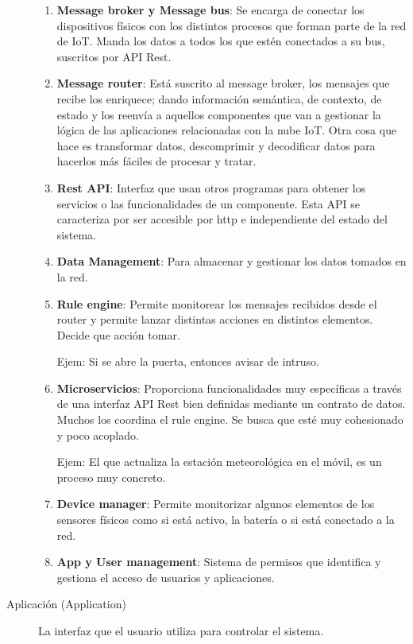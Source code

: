 \documentclass[12pt, twoside, openright]{report} %
\begin{document}
\begin{description}
	      \begin{enumerate}
		      \item \textbf{Message broker y Message bus}: Se encarga de conectar los
		            dispositivos físicos con los distintos procesos que forman parte de la
		            red de IoT. Manda los datos a todos los que estén conectados a su bus,
		            suscritos por API Rest.
		      \item \textbf{Message router}: Está suscrito al message broker, los mensajes
		            que recibe los enriquece; dando información semántica, de contexto, de
		            estado y los reenvía a aquellos componentes que van a gestionar la
		            lógica de las aplicaciones relacionadas con la nube IoT. Otra cosa que
		            hace es transformar datos, descomprimir y decodificar datos para
		            hacerlos más fáciles de procesar y tratar.
		      \item \textbf{Rest API}: Interfaz que usan otros programas para obtener los
		            servicios o las funcionalidades de un componente. Esta API se
		            caracteriza por ser accesible por http e independiente del estado del
		            sistema.
		      \item \textbf{Data Management}: Para almacenar y gestionar los datos tomados
		            en la red.
		      \item \textbf{Rule engine}: Permite monitorear los mensajes recibidos desde
		            el router y permite lanzar distintas acciones en distintos elementos.
		            Decide que acción tomar.

		            Ejem: Si se abre la puerta, entonces avisar de intruso.
		      \item \textbf{Microservicios}: Proporciona funcionalidades muy específicas a
		            través de una interfaz API Rest bien definidas mediante un contrato de
		            datos. Muchos los coordina el rule engine. Se busca que esté muy
		            cohesionado y poco acoplado.

		            Ejem: El que actualiza la estación meteorológica en el móvil, es un
		            proceso muy concreto.
		      \item \textbf{Device manager}: Permite monitorizar algunos elementos de los
		            sensores físicos como si está activo, la batería o si está conectado a
		            la red.
		      \item \textbf{App y User management}: Sistema de permisos que identifica y
		            gestiona el acceso de usuarios y aplicaciones.
	      \end{enumerate}

	\item[Aplicación (Application)] La interfaz que el usuario utiliza
	      para controlar el sistema.

\end{description}
\end{document}
